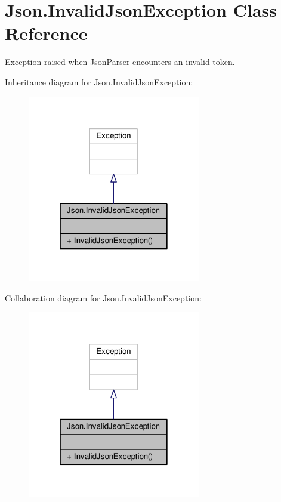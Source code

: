 \hypertarget{a00045}{\section{Json.\-Invalid\-Json\-Exception Class Reference}
\label{a00045}
}


Exception raised when \hyperlink{a00046}{Json\-Parser} encounters an invalid token.  




Inheritance diagram for Json.\-Invalid\-Json\-Exception\-:
\nopagebreak
\begin{figure}[H]
\begin{center}
\leavevmode
\includegraphics[width=214pt]{da/d15/a00188}
\end{center}
\end{figure}


Collaboration diagram for Json.\-Invalid\-Json\-Exception\-:
\nopagebreak
\begin{figure}[H]
\begin{center}
\leavevmode
\includegraphics[width=214pt]{da/deb/a00189}
\end{center}
\end{figure}
